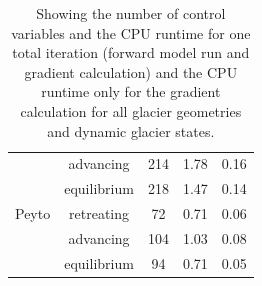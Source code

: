 \documentclass[journal abbreviation, manuscript]{copernicus}
\begin{document}
\begin{table}[]
\begin{tabular}{ccccc}
                     & advancing     & 214                      & 1.78                                                                               & 0.16                                                                                        \\ \cline{2-5} 
                     & equilibrium   & 218                      & 1.47                                                                               & 0.14                                                                                        \\ \hline
Peyto                & retreating    & 72                       & 0.71                                                                               & 0.06                                                                                        \\ \cline{2-5} 
                     & advancing     & 104                      & 1.03                                                                               & 0.08                                                                                        \\ \cline{2-5} 
\multicolumn{1}{l}{} & equilibrium   & 94                       & 0.71                                                                               & 0.05                                                                                        \\ \hline
\end{tabular}
\caption{Showing the number of control variables and the CPU runtime for one total iteration (forward model run and gradient calculation) and the CPU runtime only for the gradient calculation for all glacier geometries and dynamic glacier states.}
\label{tab_sup:number_control_vars_cpu_runtime}
\end{table}

\received{}
\pubdiscuss{} %
\revised{}
\accepted{}
\published{}


\clearpage



\end{document}
